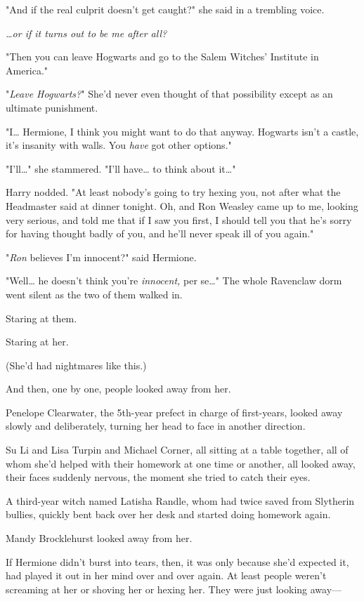 "And if the real culprit doesn't get caught?" she said in a trembling voice.

\emph{{\ldots}or if it turns out to be me after all?}

"Then you can leave Hogwarts and go to the Salem Witches' Institute in America."

"\emph{Leave Hogwarts?}" She'd never even thought of that possibility except as
an ultimate punishment.

"I{\ldots} Hermione, I think you might want to do that anyway. Hogwarts isn't a
castle, it's insanity with walls. You \emph{have} got other options."

"I'll{\ldots}" she stammered. "I'll have{\ldots} to think about it{\ldots}"

Harry nodded. "At least nobody's going to try hexing you, not after what the
Headmaster said at dinner tonight. Oh, and Ron Weasley came up to me, looking
very serious, and told me that if I saw you first, I should tell you that he's
sorry for having thought badly of you, and he'll never speak ill of you again."

"\emph{Ron} believes I'm innocent?" said Hermione.

"Well{\ldots} he doesn't think you're \emph{innocent,} per se{\ldots}"
\later
The whole Ravenclaw dorm went silent as the two of them walked in.

Staring at them.

Staring at her.

(She'd had nightmares like this.)

And then, one by one, people looked away from her.

Penelope Clearwater, the 5th-year prefect in charge of first-years, looked away
slowly and deliberately, turning her head to face in another direction.

Su Li and Lisa Turpin and Michael Corner, all sitting at a table together, all
of whom she'd helped with their homework at one time or another, all looked
away, their faces suddenly nervous, the moment she tried to catch their eyes.

A third-year witch named Latisha Randle, whom \SPHEW had twice saved from
Slytherin bullies, quickly bent back over her desk and started doing homework
again.

Mandy Brocklehurst looked away from her.

If Hermione didn't burst into tears, then, it was only because she'd expected
it, had played it out in her mind over and over again. At least people weren't
screaming at her or shoving her or hexing her. They were just looking away---

